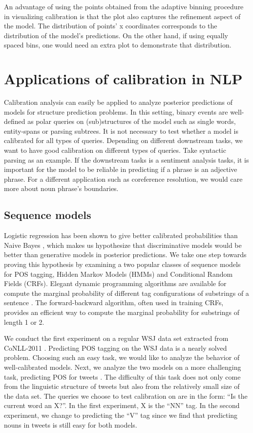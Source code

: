 An advantage of using the points obtained from the adaptive binning procedure in visualizing calibration is that the plot also captures the refinement aspect of the model. The distribution of points' x coordinates corresponds to the distribution of the model's predictions. On the other hand, if using equally spaced bins, one would need an extra plot to demonstrate that distribution. 

\section{Applications of calibration in NLP}

Calibration analysis can easily be applied to analyze posterior predictions of models for structure prediction problems. In this setting, binary events are well-defined as polar queries on (sub)structures of the model such as single words, entity-spans or parsing subtrees. It is not necessary to test whether a model is calibrated for all types of queries. Depending on different downstream tasks, we want to have good calibration on different types of queries. Take syntactic parsing as an example. If the downstream tasks is a sentiment analysis tasks, it is important for the model to be reliable in predicting if a phrase is an adjective phrase. For a different application such as coreference resolution, we would care more about noun phrase's boundaries.

\subsection{Sequence models}

Logistic regression has been shown to give better calibrated probabilities than Naive Bayes \citep{niculescu2005predicting}, which makes us hypothesize that discriminative models would be better than generative models in posterior predictions. We take one step towards proving this hypothesis by examining a two popular classes of sequence models for POS tagging, Hidden Markov Models (HMMs) and Conditional Random Fields (CRFs). Elegant dynamic programming algorithms are available for compute the marginal probability of different tag configurations of substrings of a sentence \citep{finkel2006solving}. The forward-backward algorithm, often used in training CRFs, provides an efficient way to compute the marginal probability for substrings of length 1 or 2. 

We conduct the first experiment on a regular WSJ data set extracted from CoNLL-2011 \citep{pradhan2011conll}. Predicting POS tagging on the WSJ data is a nearly solved problem. Choosing such an easy task, we would like to analyze the behavior of well-calibrated models. Next, we analyze the two models on a more challenging task, predicting POS for tweets \citep{gimpel2011part}. The difficulty of this task does not only come from the linguistic structure of tweets but also from the relatively small size of the data set. The queries we choose to test calibration on are in the form: ``Is the current word an X?''. In the first experiment, X is the ``NN'' tag. In the second experiment, we change to predicting the ``V'' tag since we find that predicting nouns in tweets is still easy for both models. 

